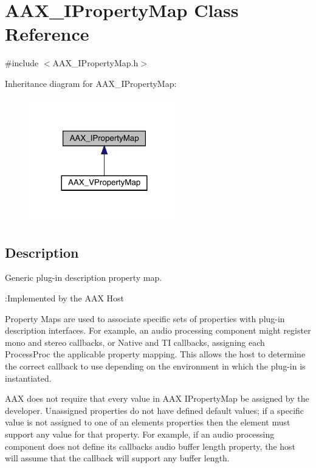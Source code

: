 \hypertarget{a01869}{}\section{A\+A\+X\+\_\+\+I\+Property\+Map Class Reference}
\label{a01869}


{\ttfamily \#include $<$A\+A\+X\+\_\+\+I\+Property\+Map.\+h$>$}



Inheritance diagram for A\+A\+X\+\_\+\+I\+Property\+Map\+:
\nopagebreak
\begin{figure}[H]
\begin{center}
\leavevmode
\includegraphics[width=185pt]{a01868}
\end{center}
\end{figure}


\subsection{Description}
Generic plug-\/in description property map. 

\begin{DoxyRefDesc}{\+:\+Implemented by the A\+A\+X Host}
\item[\mbox{\hyperlink{a00790__aax_host_implementation000011}{\+:\+Implemented by the A\+A\+X Host}}]\end{DoxyRefDesc}


Property Maps are used to associate specific sets of properties with plug-\/in description interfaces. For example, an audio processing component might register mono and stereo callbacks, or Native and TI callbacks, assigning each {\ttfamily Process\+Proc} the applicable property mapping. This allows the host to determine the correct callback to use depending on the environment in which the plug-\/in is instantiated.

A\+AX does not require that every value in A\+AX I\+Property\+Map be assigned by the developer. Unassigned properties do not have defined default values; if a specific value is not assigned to one of an element\textquotesingle{}s properties then the element must support any value for that property. For example, if an audio processing component does not define its callback\textquotesingle{}s audio buffer length property, the host will assume that the callback will support any buffer length.


